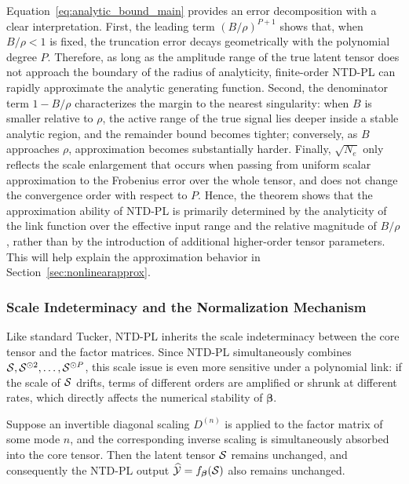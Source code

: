 Equation~\eqref{eq:analytic_bound_main} provides an error decomposition with a clear interpretation. First, the leading term $(B/\rho)^{P+1}$ shows that, when $B/\rho<1$ is fixed, the truncation error decays geometrically with the polynomial degree $P$. Therefore, as long as the amplitude range of the true latent tensor does not approach the boundary of the radius of analyticity, finite-order NTD-PL can rapidly approximate the analytic generating function. Second, the denominator term $1-B/\rho$ characterizes the margin to the nearest singularity: when $B$ is smaller relative to $\rho$, the active range of the true signal lies deeper inside a stable analytic region, and the remainder bound becomes tighter; conversely, as $B$ approaches $\rho$, approximation becomes substantially harder. Finally, $\sqrt{N_e}$ only reflects the scale enlargement that occurs when passing from uniform scalar approximation to the Frobenius error over the whole tensor, and does not change the convergence order with respect to $P$. Hence, the theorem shows that the approximation ability of NTD-PL is primarily determined by the analyticity of the link function over the effective input range and the relative magnitude of $B/\rho$, rather than by the introduction of additional higher-order tensor parameters. This will help explain the approximation behavior in Section~\ref{sec:nonlinearapprox}.

\subsubsection{Scale Indeterminacy and the Normalization Mechanism}

Like standard Tucker, NTD-PL inherits the scale indeterminacy between the core tensor and the factor matrices. Since NTD-PL simultaneously combines $\mathcal{S},\mathcal{S}^{\odot 2},\dots,\mathcal{S}^{\odot P}$, this scale issue is even more sensitive under a polynomial link: if the scale of $\mathcal{S}$ drifts, terms of different orders are amplified or shrunk at different rates, which directly affects the numerical stability of $\boldsymbol\beta$.

\begin{proposition}
\label{prop:scale_invariance_main}
Suppose an invertible diagonal scaling $D^{(n)}$ is applied to the factor matrix of some mode $n$, and the corresponding inverse scaling is simultaneously absorbed into the core tensor. Then the latent tensor $\mathcal{S}$ remains unchanged, and consequently the NTD-PL output $\widehat{\mathcal{Y}}=f_{\boldsymbol\beta}(\mathcal{S})$ also remains unchanged.
\end{proposition}

